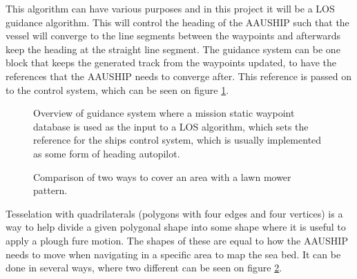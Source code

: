 This algorithm can have various purposes and in this project it will be a \ac{LOS} guidance algorithm. This will control the heading of the AAUSHIP such that the vessel will converge to the line segments between the waypoints and afterwards keep the heading at the straight line segment. The guidance system can be one block that keeps the generated track from the waypoints updated, to have the references that the AAUSHIP needs to converge after. This reference is passed on to the control system, which can be seen on figure \ref{fig:losguide}.
\begin{figure}[htbp]
	\centering
	
	\caption{Overview of guidance system where a mission static waypoint
	database is used as the input to a \ac{LOS} algorithm, which sets
the reference for the ships control system, which is usually
implemented as some form of heading autopilot.}
	\label{fig:losguide}
\end{figure}


\begin{figure}[htbp]
	\centering
	
	\caption{Comparison of two ways to cover an area with a lawn mower
	pattern.}
    \label{fig:use-case-polygon}
\end{figure}

Tesselation with quadrilaterals (polygons with four edges and four vertices) is a way to help divide a given polygonal shape into some shape where it is useful to apply a plough fure motion. The shapes of these are equal to how the AAUSHIP needs to move when navigating in a specific area to map the sea bed. It can be done in several ways, where two different can be seen on figure \ref{fig:use-case-polygon}.
